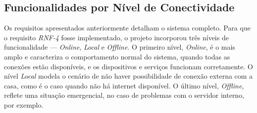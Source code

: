 \subsection{Funcionalidades por Nível de Conectividade}

Os requisitos apresentados anteriormente detalham o sistema completo. Para que o requisito \emph{RNF-4} fosse implementado, o projeto incorporou três níveis de funcionalidade --- \emph{Online}, \emph{Local} e \emph{Offline}. O primeiro nível, \emph{Online}, é o mais amplo e caracteriza o comportamento normal do sistema, quando todas as conexões estão disponíveis, e os dispositivos e serviços funcionam corretamente. O nível \emph{Local} modela o cenário de não haver possibilidade de conexão externa com a casa, como é o caso quando não há internet disponível. O último nível, \emph{Offline}, reflete uma situação emergencial, no caso de problemas com o servidor interno, por exemplo.
